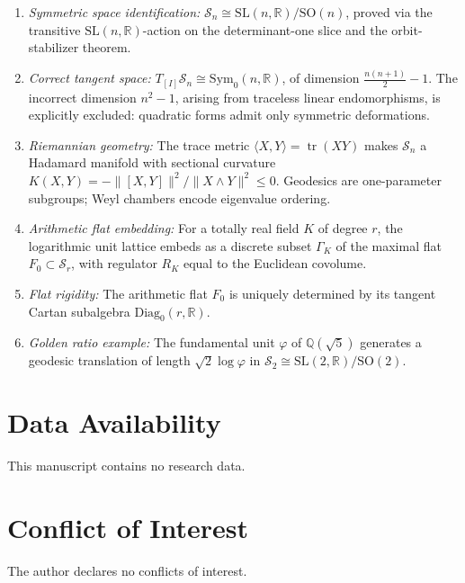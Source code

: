 \documentclass[12pt]{article}
\theoremstyle{definition}
\theoremstyle{remark}
\newcommand{\R}{\mathbb{R}}
\newcommand{\Q}{\mathbb{Q}}
\newcommand{\SL}{\mathrm{SL}}
\newcommand{\SO}{\mathrm{SO}}
\newcommand{\Symz}{\mathrm{Sym}_{0}}
\newcommand{\Diagz}{\mathrm{Diag}_{0}}
\newcommand{\calM}{\mathcal{S}}
\newcommand{\tr}{\operatorname{tr}}
\begin{document}
\begin{enumerate}
\item \emph{Symmetric space identification:}
      $\calM_n \cong \SL(n,\R)/\SO(n)$, proved via the transitive
      $\SL(n,\R)$-action on the determinant-one slice and the
      orbit-stabilizer theorem.

\item \emph{Correct tangent space:} $T_{[I]}\calM_n \cong \Symz(n,\R)$,
      of dimension $\frac{n(n+1)}{2}-1$.
      The incorrect dimension $n^2-1$, arising from traceless linear
      endomorphisms, is explicitly excluded: quadratic forms admit
      only symmetric deformations.

\item \emph{Riemannian geometry:} The trace metric $\langle X,Y\rangle
      = \tr(XY)$ makes $\calM_n$ a Hadamard manifold with sectional
      curvature $K(X,Y) = -\|[X,Y]\|^2/\|X\wedge Y\|^2 \leq 0$.
      Geodesics are one-parameter subgroups; Weyl chambers encode
      eigenvalue ordering.

\item \emph{Arithmetic flat embedding:} For a totally real field $K$
      of degree $r$, the logarithmic unit lattice embeds as a discrete
      subset $\Gamma_K$ of the maximal flat $F_0 \subset \calM_r$,
      with regulator $R_K$ equal to the Euclidean covolume.

\item \emph{Flat rigidity:} The arithmetic flat $F_0$ is uniquely
      determined by its tangent Cartan subalgebra $\Diagz(r,\R)$.

\item \emph{Golden ratio example:} The fundamental unit $\varphi$ of
      $\Q(\sqrt{5})$ generates a geodesic translation of length
      $\sqrt{2}\log\varphi$ in $\calM_2 \cong \SL(2,\R)/\SO(2)$.
\end{enumerate}


\section*{Data Availability}
This manuscript contains no research data.

\section*{Conflict of Interest}
The author declares no conflicts of interest.
\end{document}
